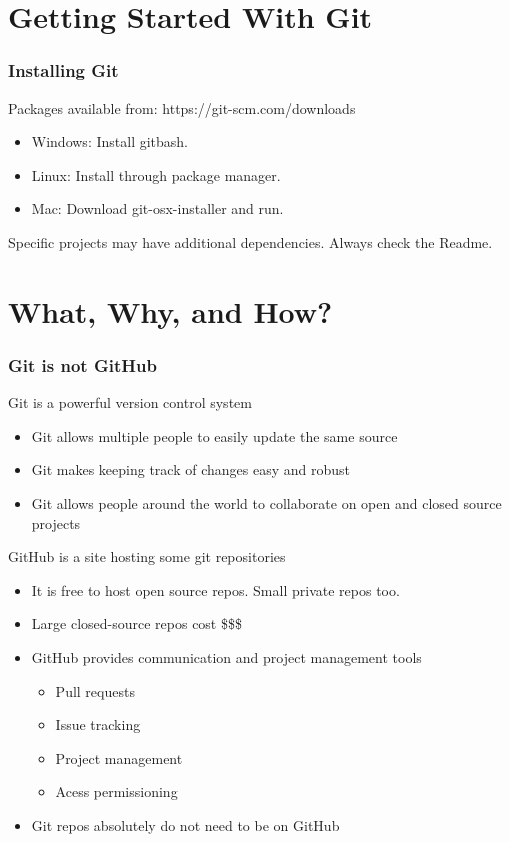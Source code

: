 \documentclass[unknownkeysallowed]{beamer}
\begin{document}
\section{Getting Started With Git}
\begin{frame}
    \frametitle{Installing Git}
    Packages available from: https://git-scm.com/downloads
    \begin{itemize}
        \item{Windows: Install gitbash.}
        \item{Linux: Install through package manager.}
        \item{Mac: Download git-osx-installer and run. }
    \end{itemize}
    Specific projects may have additional dependencies. Always check the Readme. 
    \vspace{1cm} %
\end{frame}


\section{What, Why, and How?}
\begin{frame}
    \frametitle{Git is not GitHub}
    \vspace{0.5cm} %
    Git is a powerful version control system
            \begin{itemize}
                \item{Git allows multiple people to easily update the same source}
                \item{Git makes keeping track of changes easy and robust}
       		\item{Git allows people around the world to collaborate on open and closed source projects}
            \end{itemize}
    \vspace{0.5cm}
    GitHub is a site hosting some git repositories
            \begin{itemize}
		\item{It is free to host open source repos. Small private repos too.}
                \item{Large closed-source repos cost \$\$\$}
        	\item{GitHub provides communication and project management tools}
	        \begin{itemize}
		    \item{Pull requests}
		    \item{Issue tracking}
		    \item{Project management}
		    \item{Acess permissioning}
		\end{itemize}
	\item{Git repos absolutely do not need to be on GitHub}
    \end{itemize}
\end{frame}
\end{document}
